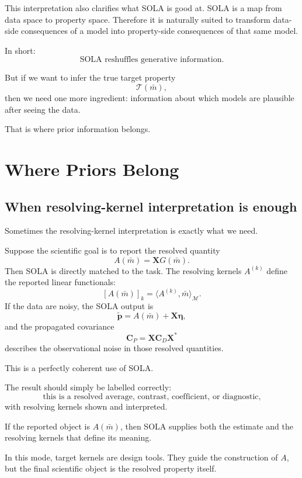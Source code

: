 \documentclass[11pt,openany]{book}
\theoremstyle{definition}
\theoremstyle{remark}
\newcommand{\M}{\mathcal M}
\newcommand{\Tau}{\mathcal{T}}
\begin{document}
This interpretation also clarifies what SOLA is good at. SOLA is a map from data space to
property space. Therefore it is naturally suited to transform data-side consequences of a model
into property-side consequences of that same model.

In short:
\[
  \boxed{
    \text{SOLA reshuffles generative information.}
  }
\]

But if we want to infer the true target property
\[
  \Tau(\bar m),
\]
then we need one more ingredient: information about which models are plausible after seeing the
data.

That is where prior information belongs.

\chapter{Where Priors Belong}

\section{When resolving-kernel interpretation is enough}

Sometimes the resolving-kernel interpretation is exactly what we need.

Suppose the scientific goal is to report the resolved quantity
\[
  A(\bar m)=\mathbf XG(\bar m).
\]
Then SOLA is directly matched to the task. The resolving kernels \(A^{(k)}\) define the reported
linear functionals:
\[
  [A(\bar m)]_k
  =
  \langle A^{(k)},\bar m\rangle_{\M}.
\]
If the data are noisy, the SOLA output is
\[
  \widetilde{\mathbf p}
  =
  A(\bar m)+\mathbf X\boldsymbol\eta,
\]
and the propagated covariance
\[
  \mathbf C_P=\mathbf X\mathbf C_D\mathbf X^*
\]
describes the observational noise in those resolved quantities.

This is a perfectly coherent use of SOLA.

The result should simply be labelled correctly:
\[
  \text{this is a resolved average, contrast, coefficient, or diagnostic,}
\]
with resolving kernels shown and interpreted.

\begin{checkpointbox}
If the reported object is \(A(\bar m)\), then SOLA supplies both the estimate and the resolving
kernels that define its meaning.
\end{checkpointbox}

In this mode, target kernels are design tools. They guide the construction of \(A\), but the final
scientific object is the resolved property itself.
\end{document}
